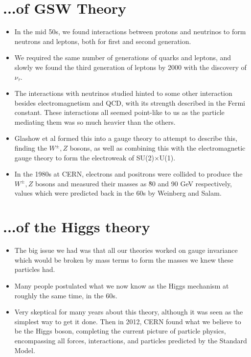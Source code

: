 \documentclass[relqm.tex]{subfiles}
\begin{document}
\section{...of GSW Theory}
\begin{itemize}
    \item In the mid 50s, we found interactions between protons and neutrinos to form neutrons and leptons, both for first and second generation.
    \item We required the same number of generations of quarks and leptons, and slowly we found the third generation of leptons by 2000 with the discovery of $\nu_\tau$.
    \item The interactions with neutrinos studied hinted to some other interaction besides electromagnetism and QCD, with its strength described in the Fermi constant. 
        These interactions all seemed point-like to us as the particle mediating them was so much heavier than the others. 
    \item Glashow et al formed this into a gauge theory to attempt to describe this, finding the $W^\pm,Z$ bosons, as well as combining this with the electromagnetic gauge theory to form the electroweak of SU(2)$\times$U(1).
    \item In the 1980s at CERN, electrons and positrons were collided to produce the $W^\pm,Z$ bosons and measured their masses as \~80 and 90 GeV respectively, values which were predicted back in the 60s by Weinberg and Salam.
\end{itemize}

\section{...of the Higgs theory}
\begin{itemize}
    \item The big issue we had was that all our theories worked on gauge invariance which would be broken by mass terms to form the masses we knew these particles had. 
    \item Many people postulated what we now know as the Higgs mechanism at roughly the same time, in the 60s. 
    \item Very skeptical for many years about this theory, although it was seen as the simplest way to get it done. 
        Then in 2012, CERN found what we believe to be the Higgs boson, completing the current picture of particle physics, encompassing all forces, interactions, and particles predicted by the Standard Model.
\end{itemize}
\end{document}
